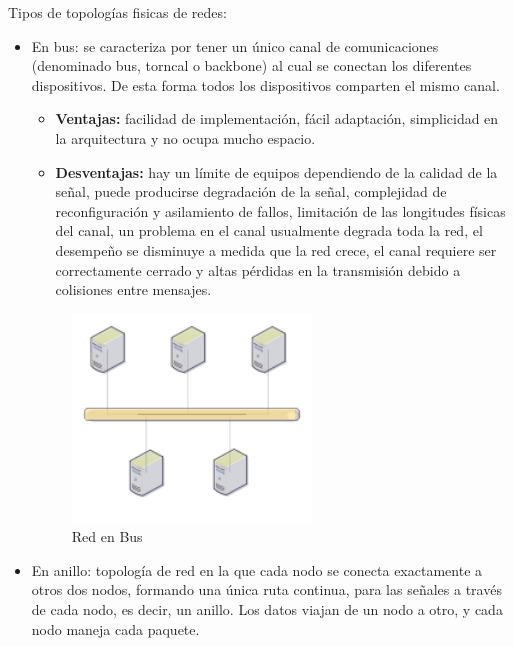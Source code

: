 \documentclass[a4paper,11pt]{article}
\begin{document}
Tipos de topologías fisicas de redes:

\begin{itemize}
\item En bus: se caracteriza por tener un único canal de comunicaciones (denominado bus, torncal o backbone) al cual se conectan los diferentes dispositivos. De esta forma todos los dispositivos comparten el mismo canal.

	\begin{itemize}
		\item \textbf{Ventajas:} facilidad de implementación, fácil adaptación, simplicidad en la arquitectura y no ocupa mucho espacio.
		\item \textbf{Desventajas:} hay un límite de equipos dependiendo de la calidad de la señal, puede producirse degradación de la señal, complejidad de reconfiguración y asilamiento de fallos, limitación de las longitudes físicas del canal, un problema en el canal usualmente degrada toda la red, el desempeño se disminuye a medida que la red crece, el canal requiere ser correctamente cerrado y altas pérdidas en la transmisión debido a colisiones entre mensajes.
	\end{itemize}
	
	\begin{figure}[h]
		\centering
		\includegraphics[scale=1,width=0.6\textwidth]{topologia_bus.png}
		\caption{Red en Bus}
	\end{figure}
	
\item En anillo: topología de red en la que cada nodo se conecta exactamente a otros dos nodos, formando una única ruta continua, para las señales a través de cada nodo, es decir, un anillo. Los datos viajan de un nodo a otro, y cada nodo maneja cada paquete.


\end{itemize}
\end{document}
